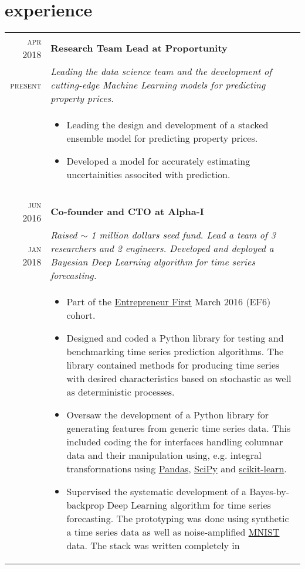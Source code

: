 \documentclass[a4paper,10pt]{article}
\begin{document}
\section{experience}
\begin{tabular}{r|p{11cm}}
\textsc{apr 2018} & \textbf{Research Team Lead at Proportunity} \\
\textsc{present} & \emph{Leading the data science team and the development of cutting-edge Machine Learning models
for predicting property prices. } \\
& \small {
  \begin{itemize}
    \item Leading the design and development of a stacked ensemble model for predicting property prices.
    \item Developed a model for accurately estimating uncertainities associted with prediction.
  \end{itemize}
}\\
\multicolumn{2}{c}{} \\
\textsc{jun 2016} & \textbf{Co-founder and CTO at Alpha-I} \\
\textsc{jan 2018} & \emph{Raised $\sim$ 1 million dollars seed fund. Lead a team of 3 researchers and 2 engineers. Developed and deployed a Bayesian Deep Learning algorithm for time series forecasting.}\\
&\small{
\begin{itemize}
  \item Part of the \href{https://www.joinef.com/}{Entrepreneur First} March 2016 (EF6) cohort.
  \item Designed and coded a Python library for testing and benchmarking time series prediction algorithms.
  The library contained methods for producing time series with desired characteristics based on stochastic as well as
  deterministic processes.
  \item Oversaw the development of a Python library for generating features from generic time series data.
  This included coding the for interfaces handling columnar data and their manipulation using, e.g.
  integral transformations using \href{https://pandas.pydata.org/}{Pandas}, \href{https://www.scipy.org/}{SciPy}
  and \href{http://scikit-learn.org/stable/}{scikit-learn}.
  \item Supervised the systematic development of a Bayes-by-backprop Deep Learning algorithm for time
  series forecasting. The prototyping was done using synthetic a time series data as well as noise-amplified
  \href{http://yann.lecun.com/exdb/mnist/}{MNIST} data. The stack was written completely in

\end{itemize}}
\end{tabular}
\end{document}
